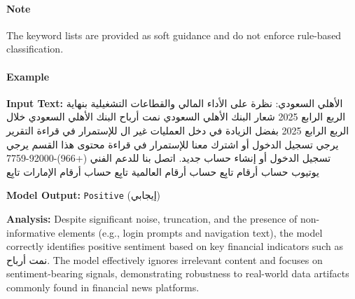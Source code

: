 \documentclass[10pt,a4paper]{article}
\begin{document}
\paragraph{Note}
The keyword lists are provided as soft guidance and do not enforce rule-based classification.

\paragraph{Example}

\textbf{Input Text:}
\small
\textarabic{الأهلي السعودي: نظرة على الأداء المالي والقطاعات التشغيلية بنهاية الربع الرابع 2025 شعار البنك الأهلي السعودي
نمت أرباح البنك الأهلي السعودي خلال الربع الرابع 2025 بفضل الزيادة في دخل العمليات غير ال
للإستمرار في قراءة التقرير يرجي تسجيل الدخول أو اشترك معنا
للإستمرار في قراءة محتوى هذا القسم يرجي تسجيل الدخول أو إنشاء حساب جديد.
اتصل بنا للدعم الفني (+966)-92000-7759
يوتيوب
حساب أرقام
تابِع
حساب أرقام العالمية
تابِع
حساب أرقام الإمارات
تابِع}

\textbf{Model Output:} \texttt{Positive} (\textarabic{إيجابي})

\textbf{Analysis:}
Despite significant noise, truncation, and the presence of non-informative elements (e.g., login prompts and navigation text), the model correctly identifies positive sentiment based on key financial indicators such as \textarabic{نمت أرباح}. The model effectively ignores irrelevant content and focuses on sentiment-bearing signals, demonstrating robustness to real-world data artifacts commonly found in financial news platforms.
\end{document}
